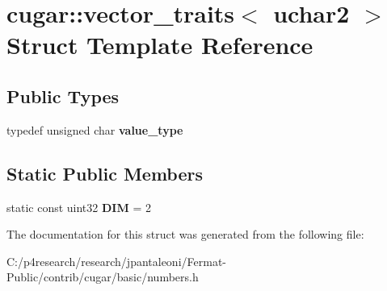 \hypertarget{structcugar_1_1vector__traits_3_01uchar2_01_4}{}\section{cugar\+:\+:vector\+\_\+traits$<$ uchar2 $>$ Struct Template Reference}
\label{structcugar_1_1vector__traits_3_01uchar2_01_4}
\subsection*{Public Types}
\begin{DoxyCompactItemize}
\item 
\mbox{\label{structcugar_1_1vector__traits_3_01uchar2_01_4_a7e4d47812e763c98963f095eca7e4317}} 
typedef unsigned char {\bfseries value\+\_\+type}
\end{DoxyCompactItemize}
\subsection*{Static Public Members}
\begin{DoxyCompactItemize}
\item 
\mbox{\label{structcugar_1_1vector__traits_3_01uchar2_01_4_a68507b3d40567f393f133e24cbfbd4c5}} 
static const uint32 {\bfseries D\+IM} = 2
\end{DoxyCompactItemize}


The documentation for this struct was generated from the following file\+:\begin{DoxyCompactItemize}
\item 
C\+:/p4research/research/jpantaleoni/\+Fermat-\/\+Public/contrib/cugar/basic/numbers.\+h\end{DoxyCompactItemize}
